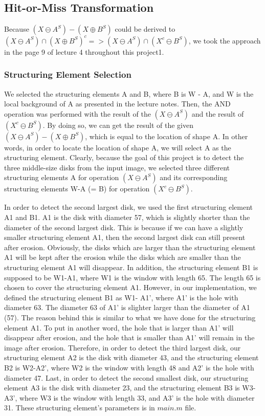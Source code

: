 \documentclass[paper=a4, fontsize=11pt]{scrartcl}
\begin{document}
\subsection{Hit-or-Miss Transformation}

Because $( X \ominus A^S) - ( X  \oplus  B^S)$ could be derived to $( X \ominus A^S ) \cap (X \oplus  B^S)^c => ( X \ominus A^S) \cap ( X^c \ominus B^S)$, we took the approach in the page 9 of lecture 4 throughout this project1. 

\subsubsection{Structuring Element Selection}

We selected the structuring elements A and B, where B is W - A, and W is the local background of A as presented in the lecture notes. Then, the AND operation was performed with the result of the $( X \ominus A^S )$ and the result of $( X^c \ominus B^S)$. By doing so, we can get the result of the given $( X \ominus A^S) - ( X  \oplus  B^S)$, which is equal to the location of shape A. In other words, in order to locate the location of shape A, we will select A as the structuring element. Clearly, because the goal of this project is to detect the three middle-size disks from the input image, we selected three different structuring elements A for operation $( X \ominus A^S)$ and its corresponding structuring elements W-A (= B) for operation $( X^c \ominus B^S) $.  

In order to detect the second largest disk, we used the first structuring element A1 and B1. A1 is the disk with diameter 57, which is slightly shorter than the diameter of the second largest disk. This is because if we can have a slightly smaller structuring element A1, then the second largest disk can still present after erosion. Obviously, the disks which are larger than the structuring element A1 will be kept after the erosion while the disks which are smaller than the structuring element A1 will disappear.  In addition, the structuring element B1 is supposed to be W1-A1, where W1 is the window with length 65. The length 65 is chosen to cover the structuring element A1. However, in our implementation, we defined the structuring element B1 as W1- A1', where A1' is the hole with diameter 63. The diameter 63 of A1' is slighter larger than the diameter of A1 (57). The reason behind this is similar to what we have done for the structuring element A1. To put in another word, the hole that is larger than A1' will disappear after erosion, and the hole that is smaller than A1' will remain in the image after erosion. Therefore, in order to detect the third largest disk, our structuring element A2 is the disk with diameter 43, and the structuring element B2 is W2-A2', where W2 is the window with length 48 and A2' is the hole with diameter 47. Last, in order to detect the second smallest disk, our structuring element A3 is the disk with diameter  23, and the structuring element B3 is W3-A3', where W3 is the window with length 33, and A3' is the hole with diameter 31. These structuring element's parameters is in $main.m$ file.
\end{document}
